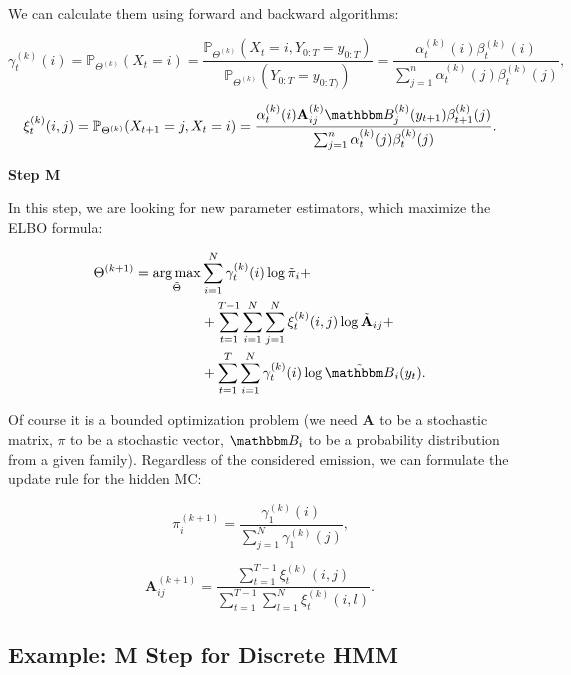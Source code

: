 \documentclass[shortabstract]{iithesis}
\DeclareMathOperator*{\argmax}{arg\,max}
\begin{document}
We can calculate them using forward and backward algorithms:

$$\gamma_t^{(k)}(i) = \mathbb P_{\Theta^{(k)}}(X_t = i) = \frac {\mathbb P_{\Theta^{(k)}}(X_t = i, Y_{0:T} = y_{0:T}) } {\mathbb P_{\Theta^{(k)}} (Y_{0:T} = y_{0:T)})} = \frac {\alpha_t^{(k)}(i) \beta_t^{(k)}(i)} {\sum_{j=1}^n \alpha_t^{(k)}(j) \beta_t^{(k)}(j)}\text{,}$$

$$\xi_t^{(k)}(i, j) = \mathbb P_{\Theta^{(k)}}(X_{t+1} = j, X_{t} = i) = \frac{\alpha_{t}^{(k)}(i) \textbf{A}^{(k)}_{ij} \mathbbm B^{(k)}_j(y_{t+1}) \beta_{t+1}^{(k)}(j)}{\sum_{j=1}^n \alpha_t^{(k)}(j) \beta_{t}^{(k)}(j)}\text{.}$$


\textbf{Step M}

In this step, we are looking for new parameter estimators, which maximize the ELBO formula:  

\begin{equation*}
    \begin{aligned}
        \Theta^{(k+1)} = \argmax_{\Tilde{\Theta}} & \sum_{i=1}^N \gamma_t^{(k)}(i)\log \Tilde{\pi}_{i} + \\ 
        & +  \sum_{t=1}^{T-1} \sum_{i=1}^N  \sum_{j=1}^N \xi_{t}^{(k)}(i, j) \log \Tilde{\textbf{A}}_{ij} + \\ 
        & +  \sum_{t=1}^T \sum_{i=1}^N \gamma_t^{(k)}(i) \log \Tilde{\mathbbm B}_{i}(y_t)\text{.}
    \end{aligned}
\end{equation*}

Of course it is a bounded optimization problem (we need $\textbf{A}$ to be a stochastic matrix, $\pi$ to be a stochastic vector, $\mathbbm B_i$ to be a probability distribution from a given family). Regardless of the considered emission, we can formulate the update rule for the hidden MC:

\begin{equation} \label{eq:m_update_pi}
    \pi_i^{(k+1)} = \frac{\gamma_1^{(k)}(i)}{\sum_{j=1}^N \gamma_1^{(k)}(j)}\text{,}
\end{equation}

\begin{equation}\label{eq:m_update_a}
    \textbf{A}_{ij}^{(k+1)} = \frac{\sum_{t=1}^{T-1}\xi_t^{(k)}(i, j)}{\sum_{t=1}^{T-1}\sum_{l=1}^N \xi_t^{(k)}(i, l)}\text{.}
\end{equation}

\subsection{Example: M Step for Discrete HMM}
\end{document}
